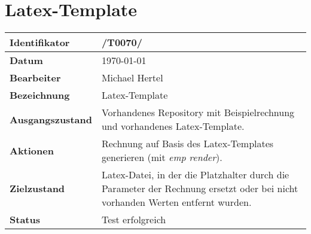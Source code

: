 
\section{Latex-Template}

\renewcommand{\arraystretch}{1.5}

\begin{center}
 \begin{tabular}{|p{}|p{}|}
	\hline
	\textbf{Identifikator}  & /T0070/ \\
	\hline
	\textbf{Datum} & \today \\
	\hline
	\textbf{Bearbeiter} & Michael Hertel \\
	\hline
	\textbf{Bezeichnung} & Latex-Template \\
	\hline
	\textbf{Ausgangszustand} &
		Vorhandenes Repository mit Beispielrechnung und vorhandenes Latex-Template. \\
	\hline
	\textbf{Aktionen} &
		Rechnung auf Basis des Latex-Templates generieren (mit \textit{emp render}). \\
	\hline
	\textbf{Zielzustand} &
		Latex-Datei, in der die Platzhalter durch die Parameter der Rechnung ersetzt oder bei nicht vorhanden Werten entfernt wurden. \\
	\hline
	\textbf{Status} & Test erfolgreich \\
	\hline
 \end{tabular}
\end{center}
